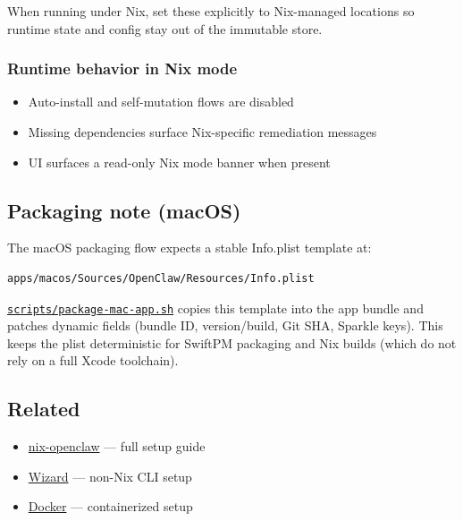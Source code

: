 When running under Nix, set these explicitly to Nix-managed locations so runtime state and config
stay out of the immutable store.

\subsubsection{Runtime behavior in Nix mode}


\begin{itemize}
  \item Auto-install and self-mutation flows are disabled
  \item Missing dependencies surface Nix-specific remediation messages
  \item UI surfaces a read-only Nix mode banner when present
\end{itemize}


\subsection{Packaging note (macOS)}


The macOS packaging flow expects a stable Info.plist template at:

\begin{lstlisting}
apps/macos/Sources/OpenClaw/Resources/Info.plist
\end{lstlisting}


\href{https://github.com/openclaw/openclaw/blob/main/scripts/package-mac-app.sh}{\texttt{scripts/package-mac-app.sh}} copies this template into the app bundle and patches dynamic fields
(bundle ID, version/build, Git SHA, Sparkle keys). This keeps the plist deterministic for SwiftPM
packaging and Nix builds (which do not rely on a full Xcode toolchain).

\subsection{Related}


\begin{itemize}
  \item \href{https://github.com/openclaw/nix-openclaw}{nix-openclaw} — full setup guide
  \item \href{/start/wizard}{Wizard} — non-Nix CLI setup
  \item \href{/install/docker}{Docker} — containerized setup
\end{itemize}



\clearpage

